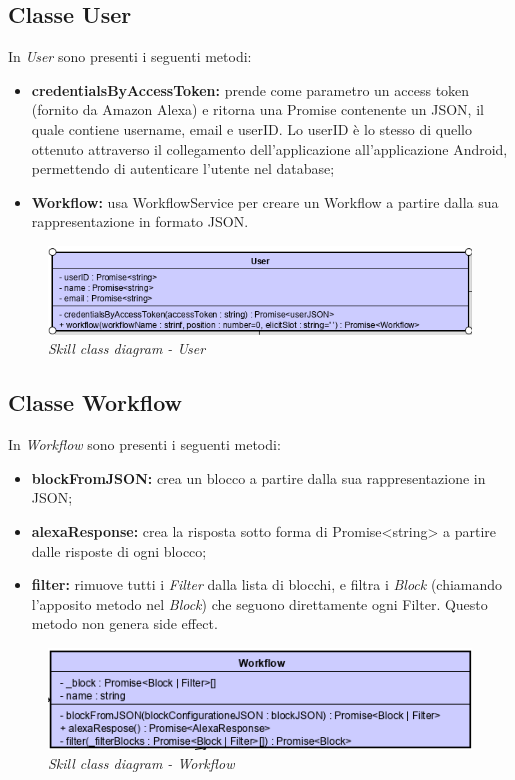 \subsection{Classe User}
In \textit{User} sono presenti i seguenti metodi:
\begin{itemize}
    \item \textbf{credentialsByAccessToken:} prende come parametro un access token (fornito da Amazon Alexa) e ritorna una Promise contenente un JSON, il quale contiene username, email e userID. Lo userID è lo stesso di quello ottenuto attraverso il collegamento dell'applicazione all'applicazione Android, permettendo di autenticare l'utente nel database;
    \item \textbf{Workflow:} usa WorkflowService per creare un Workflow a partire dalla sua rappresentazione in formato JSON.
\end{itemize}
\begin{figure} [h]
    \centering
	\includegraphics[scale=0.8]{./images/user.PNG}
	\caption{\textit{Skill class diagram - User}}\label{classlambda}
\end{figure}
\subsection{Classe Workflow}
In \textit{Workflow} sono presenti i seguenti metodi:
\begin{itemize}
    \item \textbf{blockFromJSON:} crea un blocco a partire dalla sua rappresentazione in JSON;
    \item \textbf{alexaResponse:} crea la risposta sotto forma di Promise<string> a partire dalle risposte di ogni blocco;
    \item \textbf{filter:} rimuove tutti i \textit{Filter} dalla lista di blocchi, e filtra i \textit{Block} (chiamando l'apposito metodo nel \textit{Block}) che seguono direttamente ogni Filter. Questo metodo non genera side effect.
\end{itemize}
\begin{figure} [h]
    \centering
	\includegraphics[scale=0.8]{./images/workflow.PNG}
	\caption{\textit{Skill class diagram - Workflow}}\label{classlambda}
\end{figure}
